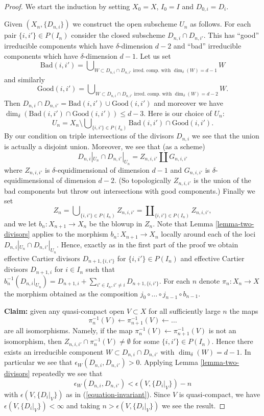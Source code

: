 \begin{proof}
\medskip\noindent
We start the induction by setting $X_0 = X$,
$I_0 = I$ and $D_{0, i} = D_i$.

\medskip\noindent
Given $(X_n, \{D_{n, i}\})$ we construct the open subscheme
$U_n$ as follows. For each pair $\{i, i'\} \in P(I_n)$ consider
the closed subscheme $D_{n, i} \cap D_{n, i'}$. This has ``good''
irreducible components which have $\delta$-dimension $d - 2$ and
``bad'' irreducible components which have $\delta$-dimension $d - 1$.
Let us set
$$
\text{Bad}(i, i')
=
\bigcup\nolimits_{W \subset D_{n, i} \cap D_{n, i'}
\text{ irred.\ comp. with }\dim_\delta(W) = d - 1} W
$$
and similarly
$$
\text{Good}(i, i')
=
\bigcup\nolimits_{W \subset D_{n, i} \cap D_{n, i'}
\text{ irred.\ comp. with }\dim_\delta(W) = d - 2} W.
$$
Then $D_{n, i} \cap D_{n, i'} = \text{Bad}(i, i') \cup \text{Good}(i, i')$
and moreover we have
$\dim_\delta(\text{Bad}(i, i') \cap \text{Good}(i, i')) \leq d - 3$.
Here is our choice of $U_n$:
$$
U_n
=
X_n
\setminus
\bigcup\nolimits_{\{i, i'\} \in P(I_n)}
\text{Bad}(i, i') \cap \text{Good}(i, i').
$$
By our condition on triple intersections of the divisors $D_{n, i}$
we see that the union is actually a disjoint union. Moreover,
we see that (as a scheme)
$$
D_{n, i}|_{U_n} \cap D_{n, i'}|_{U_n}
=
Z_{n, i, i'} \amalg G_{n, i, i'}
$$
where $Z_{n, i, i'}$ is $\delta$-equidimensional of dimension $d - 1$
and $G_{n, i, i'}$ is $\delta$-equidimensional of dimension $d - 2$.
(So topologically $Z_{n, i, i'}$ is the union of the bad components
but throw out intersections with good components.) Finally we set
$$
Z_n =
\bigcup\nolimits_{\{i, i'\} \in P(I_n)} Z_{n, i, i'} =
\coprod\nolimits_{\{i, i'\} \in P(I_n)} Z_{n, i, i'},
$$
and we let $b_n : X_{n + 1} \to X_n$ be the blowup in $Z_n$.
Note that Lemma \ref{lemma-two-divisors}
applies to the morphism $b_n : X_{n + 1} \to X_n$ locally around
each of the loci $D_{n, i}|_{U_n} \cap D_{n, i'}|_{U_n}$. Hence,
exactly as in the first part of the proof we obtain effective
Cartier divisors $D_{n + 1, \{i, i'\}}$ for $\{i, i'\} \in P(I_n)$
and effective Cartier divisors $D_{n + 1, i}$ for $i \in I_n$
such that
$b_n^{-1}(D_{n, i}|_{U_n}) = D_{n + 1, i} +
\sum\nolimits_{i' \in I_n, i' \not = i} D_{n + 1, \{i, i'\}}$.
For each $n$ denote $\pi_n : X_n \to X$ the morphism obtained
as the composition $j_0 \circ \ldots \circ j_{n - 1} \circ b_{n - 1}$.

\medskip\noindent
{\bf Claim:} given any quasi-compact open $V \subset X$
for all sufficiently large $n$ the maps
$$
\pi_n^{-1}(V) \leftarrow \pi_{n + 1}^{-1}(V) \leftarrow \ldots
$$
are all isomorphisms. Namely, if the map
$\pi_n^{-1}(V) \leftarrow \pi_{n + 1}^{-1}(V)$ is not an isomorphism,
then $Z_{n, i, i'} \cap \pi_n^{-1}(V) \not = \emptyset$ for some
$\{i, i'\} \in P(I_n)$. Hence there exists an irreducible component
$W \subset D_{n, i} \cap D_{n, i'}$ with $\dim_\delta(W) = d - 1$.
In particular we see that $\epsilon_W(D_{n, i}, D_{n, i'}) > 0$.
Applying Lemma \ref{lemma-two-divisors} repeatedly we see that
$$
\epsilon_W(D_{n, i}, D_{n, i'})
<
\epsilon(V, \{D_i|_V\}) - n
$$
with $\epsilon(V, \{D_i|_V\})$ as in (\ref{equation-invariant}).
Since $V$ is quasi-compact, we have
$\epsilon(V, \{D_i|_V\}) < \infty$ and taking $n > \epsilon(V, \{D_i|_V\})$
we see the result.


\end{proof}
